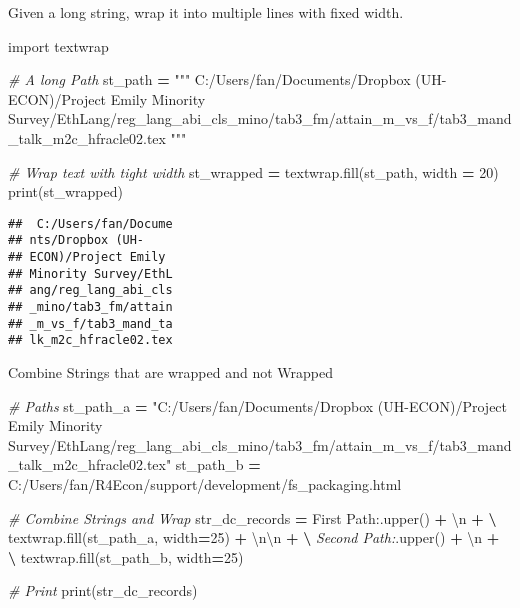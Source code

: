 \documentclass[
]{book}
\newenvironment{Shaded}{\begin{snugshade}}{\end{snugshade}}
\newcommand{\BuiltInTok}[1]{#1}
\newcommand{\CharTok}[1]{\textcolor[rgb]{0.31,0.60,0.02}{#1}}
\newcommand{\CommentTok}[1]{\textcolor[rgb]{0.56,0.35,0.01}{\textit{#1}}}
\newcommand{\DecValTok}[1]{\textcolor[rgb]{0.00,0.00,0.81}{#1}}
\newcommand{\ImportTok}[1]{#1}
\newcommand{\NormalTok}[1]{#1}
\newcommand{\OperatorTok}[1]{\textcolor[rgb]{0.81,0.36,0.00}{\textbf{#1}}}
\newcommand{\StringTok}[1]{\textcolor[rgb]{0.31,0.60,0.02}{#1}}
\begin{document}
Given a long string, wrap it into multiple lines with fixed width.

\begin{Shaded}
\begin{Highlighting}[]
\ImportTok{import}\NormalTok{ textwrap}

\CommentTok{\# A long Path}
\NormalTok{st\_path }\OperatorTok{=} \StringTok{"""}
\StringTok{C:/Users/fan/Documents/Dropbox (UH{-}ECON)/Project Emily Minority Survey/EthLang/reg\_lang\_abi\_cls\_mino/tab3\_fm/attain\_m\_vs\_f/tab3\_mand\_talk\_m2c\_hfracle02.tex}
\StringTok{"""}

\CommentTok{\# Wrap text with tight width}
\NormalTok{st\_wrapped }\OperatorTok{=}\NormalTok{ textwrap.fill(st\_path, width }\OperatorTok{=} \DecValTok{20}\NormalTok{)}
\BuiltInTok{print}\NormalTok{(st\_wrapped)}
\end{Highlighting}
\end{Shaded}

\begin{verbatim}
##  C:/Users/fan/Docume
## nts/Dropbox (UH-
## ECON)/Project Emily
## Minority Survey/EthL
## ang/reg_lang_abi_cls
## _mino/tab3_fm/attain
## _m_vs_f/tab3_mand_ta
## lk_m2c_hfracle02.tex
\end{verbatim}

Combine Strings that are wrapped and not Wrapped

\begin{Shaded}
\begin{Highlighting}[]

\CommentTok{\# Paths}
\NormalTok{st\_path\_a }\OperatorTok{=} \StringTok{"C:/Users/fan/Documents/Dropbox (UH{-}ECON)/Project Emily Minority Survey/EthLang/reg\_lang\_abi\_cls\_mino/tab3\_fm/attain\_m\_vs\_f/tab3\_mand\_talk\_m2c\_hfracle02.tex"}
\NormalTok{st\_path\_b }\OperatorTok{=} \StringTok{\textquotesingle{}C:/Users/fan/R4Econ/support/development/fs\_packaging.html\textquotesingle{}}

\CommentTok{\# Combine Strings and Wrap}
\NormalTok{str\_dc\_records }\OperatorTok{=} \StringTok{\textquotesingle{}First Path:\textquotesingle{}}\NormalTok{.upper() }\OperatorTok{+} \StringTok{\textquotesingle{}}\CharTok{\textbackslash{}n}\StringTok{\textquotesingle{}} \OperatorTok{+} \OperatorTok{\textbackslash{}}
\NormalTok{                 textwrap.fill(st\_path\_a, width}\OperatorTok{=}\DecValTok{25}\NormalTok{) }\OperatorTok{+} \StringTok{\textquotesingle{}}\CharTok{\textbackslash{}n\textbackslash{}n}\StringTok{\textquotesingle{}} \OperatorTok{+} \OperatorTok{\textbackslash{}}
                 \CommentTok{\textquotesingle{}Second Path:\textquotesingle{}}\NormalTok{.upper() }\OperatorTok{+} \StringTok{\textquotesingle{}}\CharTok{\textbackslash{}n}\StringTok{\textquotesingle{}} \OperatorTok{+} \OperatorTok{\textbackslash{}}
\NormalTok{                 textwrap.fill(st\_path\_b, width}\OperatorTok{=}\DecValTok{25}\NormalTok{)}
              
\CommentTok{\# Print}
\BuiltInTok{print}\NormalTok{(str\_dc\_records)                 }
\end{Highlighting}
\end{Shaded}
\end{document}
